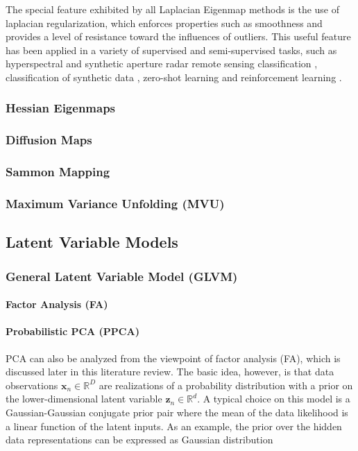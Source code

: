 The special feature exhibited by all Laplacian Eigenmap methods is the use of laplacian regularization, which enforces properties such as smoothness and provides a level of resistance toward the influences of outliers.  This useful feature has been applied in a variety of supervised and semi-supervised tasks, such as hyperspectral and synthetic aperture radar remote sensing classification \citep{Ratle2010ManRegHSI, Ren2017ManRegSAR}, classification of synthetic data \citep{Tsang2007ManifoldRegularization}, zero-shot learning \citep{Meng2018ManRegZeroShot} and reinforcement learning \citep{Li2015ManRegReinforcementLearning}.

\subsubsection{Hessian Eigenmaps}

\subsubsection{Diffusion Maps}

\subsubsection{Sammon Mapping} \label{sec:sammon_mapping}

\subsubsection{Maximum Variance Unfolding (MVU)}

\subsection{Latent Variable Models}

\subsubsection{General Latent Variable Model (GLVM)}

\paragraph{Factor Analysis (FA)}

\paragraph{Probabilistic PCA (PPCA)}
PCA can also be analyzed from the viewpoint of factor analysis (FA), which is discussed later in this literature review.  The basic idea, however, is that data observations $\bm{x}_{n} \in \mathbb{R}^{D}$ are realizations of a probability distribution with a prior on the lower-dimensional latent variable $\bm{z}_n \in \mathbb{R}^{d}$.  A typical choice on this model is a Gaussian-Gaussian conjugate prior pair where the mean of the data likelihood is a linear function of the latent inputs.  As an example, the prior over the hidden data representations can be expressed as Gaussian distribution

